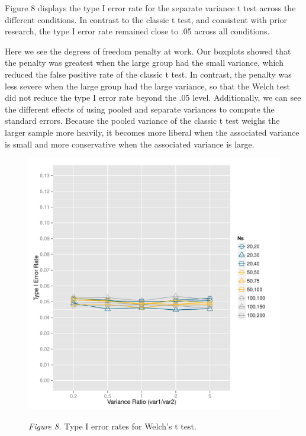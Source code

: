 \documentclass[man,a4paper,noextraspace,apacite]{apa6}\usepackage[]{graphicx}\usepackage[]{color}
\makeatletter
\def\maxwidth{ %
  \ifdim\Gin@nat@width>\linewidth
    \linewidth
  \else
    \Gin@nat@width
  \fi
}
\newenvironment{knitrout}{}{} %
\makeatother
\begin{document}
    Figure 8 displays the type I error rate for the separate variance t test across the different conditions. In contrast to the classic t test, and consistent with prior research, the type I error rate remained close to .05 across all conditions. 
    
    Here we see the degrees of freedom penalty at work. Our boxplots showed that the penalty was greatest when the large group had the small variance, which reduced the false positive rate of the classic t test. In contrast, the penalty was less severe when the large group had the large variance, so that the Welch test did not reduce the type I error rate beyond the .05 level. Additionally, we can see the different effects of using pooled and separate variances to compute the standard errors. Because the pooled variance of the classic t test weighs the larger sample more heavily, it becomes more liberal when the associated variance is small and more conservative when the associated variance is large. 

\begin{figure}
\begin{knitrout}
\color{fgcolor}
\includegraphics[width=\maxwidth]{figure/type1_Welch_plot} 

\end{knitrout}
\textit{Figure 8.} Type I error rates for Welch's t test.
\end{figure}
\end{document}
